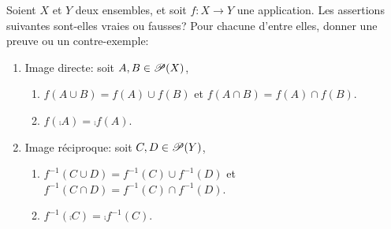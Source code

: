 {\begin{td-sol}[]
\begin{enumerate}
        \end{enumerate}
        
    \end{td-sol}
}{}
\begin{td-exo}
    Soient \(X\) et \(Y\) deux ensembles, et soit \(f:X\to Y\) une application. 
    Les assertions suivantes sont-elles vraies ou fausses? Pour chacune d'entre
    elles, donner une preuve ou un contre-exemple:
    \begin{enumerate}
        \item Image directe: soit \(A,B\in\mathscr{P}(X)\),
            \begin{enumerate}
                \item \(f(A\cup B) = f(A)\cup f(B)\) et \(f(A\cap B) = f(A)\cap f(B)\).
                \item \(f(\comp{A})=\comp{f(A)}\).
            \end{enumerate}
        \item Image réciproque: soit \(C,D\in\mathscr{P}(Y)\),
            \begin{enumerate}
                \item \(f^{-1}(C\cup D) = f^{-1}(C)\cup f^{-1}(D)\) et \(f^{-1}(C\cap D) = f^{-1}(C)\cap f^{-1}(D)\).
                \item \(f^{-1}(\comp{C})=\comp{f^{-1}(C)}\).
            \end{enumerate}
    \end{enumerate}
\end{td-exo}

